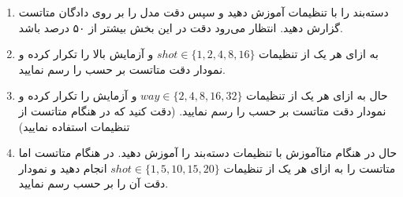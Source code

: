 \documentclass{article}
\begin{document}
\begin{enumerate}


\item
دسته‌بند را با تنظیمات
آموزش دهید و سپس دقت مدل را بر روی دادگان متاتست گزارش دهید.
انتظار می‌رود دقت در این بخش بیشتر از ۵۰ درصد باشد.

\item
به ازای هر یک از تنظیمات
$shot \in \{1, 2, 4, 8, 16\}$
و
آزمایش بالا را تکرار کرده و نمودار دقت متاتست بر حسب
را رسم نمایید.

\item
حال به ازای هر یک از تنظیمات
$way \in \{2, 4, 8, 16, 32\}$
و
آزمایش را تکرار کرده و نمودار دقت متاتست بر حسب
را رسم نمایید.
(دقت کنید که در هنگام متاتست از تنظیمات
استفاده نمایید)


\item
حال در هنگام متاآموزش با تنظیمات
دسته‌بند را آموزش دهید.
در هنگام متاتست اما متاتست را به ازای هر یک از تنظیمات
$shot \in \{1, 5,10, 15, 20\} $
انجام دهید و نمودار دقت آن را بر حسب 
رسم نمایید.

\end{enumerate}
\end{document}
